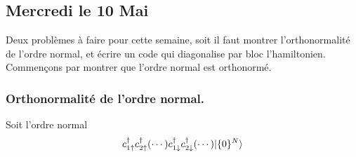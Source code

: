 \documentclass{subfiles}[../main.tex]
\begin{document}



        \subsection{Mercredi le 10 Mai}
            Deux problèmes à faire pour cette semaine, soit il faut montrer
            l'orthonormalité de l'ordre normal, et écrire un code qui diagonalise
            par bloc l'hamiltonien. Commençons par montrer que l'ordre normal
            est orthonormé.
            \subsubsection{Orthonormalité de l'ordre normal.} %
            \label{sec:orthonormalité de l'ordre normal.}
                Soit l'ordre normal
                \begin{align}
                    c^\dagger_{1\uparrow}c^\dagger_{2\uparrow}(\cdots)
                    c^\dagger_{1\downarrow}c^\dagger_{2\downarrow}(\cdots)
                    |{\{0\}^N}\rangle
                \end{align}
            

\end{document}
